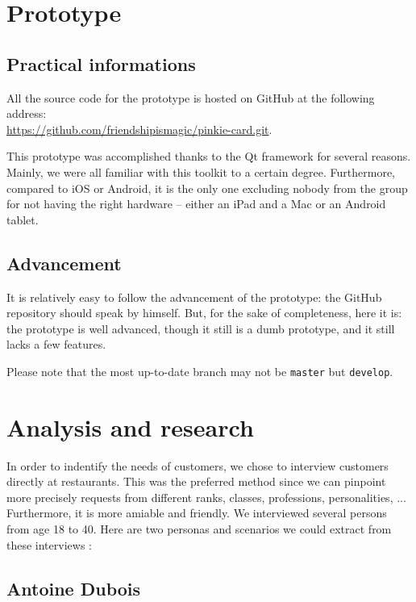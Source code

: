 \documentclass[a4paper,12pt]{article}
\begin{document}
\section{Prototype}

\subsection{Practical informations}

All the source code for the prototype is hosted on GitHub at the following address: \\
\url{https://github.com/friendshipismagic/pinkie-card.git}.

This prototype was accomplished thanks to the Qt framework for several reasons. Mainly, we were all familiar with this
toolkit to a certain degree. Furthermore, compared to iOS or Android, it is the only one excluding nobody from the
group for not having the right hardware -- either an iPad and a Mac or an Android tablet.

\subsection{Advancement}

It is relatively easy to follow the advancement of the prototype: the GitHub repository should speak by himself.
But, for the sake of completeness, here it is: the prototype is well advanced, though it still is a dumb prototype,
and it still lacks a few features.

Please note that the most up-to-date branch may not be \texttt{master} but \texttt{develop}.

\section{Analysis and research}

In order to indentify the needs of customers, we chose to interview customers directly at restaurants. This was the
preferred method since we can pinpoint more precisely requests from different ranks, classes, professions,
personalities, ... Furthermore, it is more amiable and friendly. We interviewed several persons from age 18 to 40.
Here are two personas and scenarios we could extract from these interviews :

\subsection{Antoine Dubois}
\end{document}
